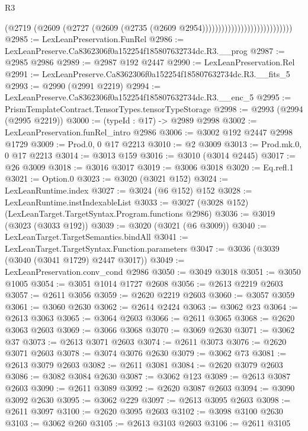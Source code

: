 \begin{lexlean}{R3}
\begin{coremodule}
                                                (@2719
                                                  (@2609
                                                    (@2727
                                                      (@2609
                                                        (@2735
                                                          (@2609 @2954))))))))))))))))))))))))))))
@2985 := LexLeanPreservation.FunRel
@2986 := LexLeanPreserve.Ca8362306f0a152254f185807632734dc.R3.__prog
@2987 := @2985 @2986
@2989 := @2987 @192 @2447
@2990 := LexLeanPreservation.Rel
@2991 := LexLeanPreserve.Ca8362306f0a152254f185807632734dc.R3.__fits_5
@2993 := @2990 (@2991 @2219)
@2994 := LexLeanPreserve.Ca8362306f0a152254f185807632734dc.R3.__enc_5
@2995 := PrismTemplateContract.TensorTypes.tensorTypeStorage
@2998 := @2993 (@2994 (@2995 @2219))
@3000 := (typeId : @17) -> @2989 @2998
@3002 := LexLeanPreservation.funRel_intro @2986
@3006 := @3002 @192 @2447 @2998 @1729
@3009 := Prod.{0, 0} @17 @2213
@3010 := @2 @3009
@3013 := Prod.mk.{0, 0} @17 @2213
@3014 := @3013 @159
@3016 := @3010 (@3014 @2445)
@3017 := @26 @3009
@3018 := @3016 @3017
@3019 := @3006 @3018
@3020 := Eq.refl.{1}
@3021 := Option.{0}
@3023 := @3020 (@3021 @152)
@3024 := LexLeanRuntime.index
@3027 := @3024 (@6 @152) @152
@3028 := LexLeanRuntime.instIndexableList
@3033 := @3027 (@3028 @152) (LexLeanTarget.TargetSyntax.Program.functions @2986)
@3036 := @3019 (@3023 (@3033 @192))
@3039 := @3020 (@3021 (@6 @3009))
@3040 := LexLeanTarget.TargetSemantics.bindAll
@3041 := LexLeanTarget.TargetSyntax.Function.parameters
@3047 := @3036 (@3039 (@3040 (@3041 @1729) @2447 @3017))
@3049 := LexLeanPreservation.conv_cond @2986
@3050 := @3049 @3018
@3051 := @3050 @1005
@3054 := @3051 @1014 @1727 @2608
@3056 := @2613 @2219 @2603
@3057 := @2611 @3056
@3059 := @2620 @2219 @2603
@3060 := @3057 @3059
@3061 := @3060 @2630
@3062 := @2614 @2424
@3063 := @3062 @23
@3064 := @2613 @3063
@3065 := @3064 @2603
@3066 := @2611 @3065
@3068 := @2620 @3063 @2603
@3069 := @3066 @3068
@3070 := @3069 @2630
@3071 := @3062 @37
@3073 := @2613 @3071 @2603
@3074 := @2611 @3073
@3076 := @2620 @3071 @2603
@3078 := @3074 @3076 @2630
@3079 := @3062 @73
@3081 := @2613 @3079 @2603
@3082 := @2611 @3081
@3084 := @2620 @3079 @2603
@3086 := @3082 @3084 @2630
@3087 := @3062 @123
@3089 := @2613 @3087 @2603
@3090 := @2611 @3089
@3092 := @2620 @3087 @2603
@3094 := @3090 @3092 @2630
@3095 := @3062 @229
@3097 := @2613 @3095 @2603
@3098 := @2611 @3097
@3100 := @2620 @3095 @2603
@3102 := @3098 @3100 @2630
@3103 := @3062 @260
@3105 := @2613 @3103 @2603
@3106 := @2611 @3105

\end{coremodule}
\end{lexlean}
